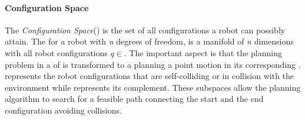 \paragraph{Configuration Space}


The \textit{Configuration Space}(\CS{}) is the set of all configurations a robot can possibly attain. The \CS{} for a robot with \textit{n} degrees of freedom, is a manifold \M{} of \textit{n} dimensions with all robot configurations $q\in$\M{}. The important aspect is that the planning problem in a \WS{} of \sethree{} is transformed to a planning a point motion in its corresponding \CS{}. \CSobst{} represents the robot configurations that are self-colliding or in collision with the environment while \CSfree{} represents its complement. These subspaces allow the planning algorithm to search for a feasible path connecting the start and the end configuration avoiding collisions. 



